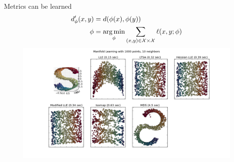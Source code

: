\begin{frame}[fragile]{Metrics can be learned}
\begin{align*}
d'_\phi(x,y) & = d(\phi(x),\phi(y))\\
\phi &= \operatorname*{arg\,min}_{\phi} \sum_{(x,y) \in \mathcal{{X}} \times \mathcal{{X}}} \ell(x,y;\phi)
\end{align*}
\hspace{-1.5cm}\includegraphics[height=6cm,width=15cm]{slides/manifold.png}
\end{frame}

